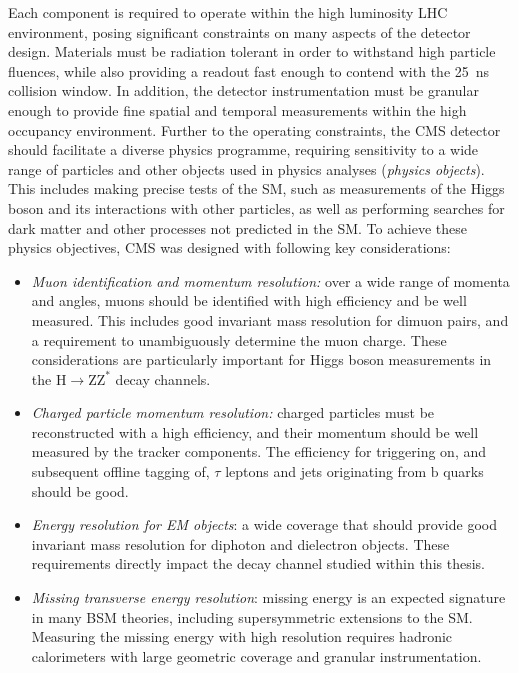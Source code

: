 Each component is required to operate within the high luminosity LHC environment, posing significant constraints on many aspects of the detector design. Materials must be radiation tolerant in order to withstand high particle fluences, while also providing a readout fast enough to contend with the 25~ns collision window. In addition, the detector instrumentation must be granular enough to provide fine spatial and temporal measurements within the high occupancy environment. Further to the operating constraints, the CMS detector should facilitate a diverse physics programme, requiring sensitivity to a wide range of particles and other objects used in physics analyses (\textit{physics objects}). This includes making precise tests of the SM, such as measurements of the Higgs boson and its interactions with other particles, as well as performing searches for dark matter and other processes not predicted in the SM. To achieve these physics objectives, CMS was designed with following key considerations: 

\begin{itemize}
    \item \textit{Muon identification and momentum resolution:} over a  wide  range  of  momenta and angles, muons should be identified with high efficiency and be well measured. This includes good invariant mass resolution for dimuon pairs, and a requirement to unambiguously determine the muon charge. These considerations are particularly important for Higgs boson measurements in the $\mathrm{H}\rightarrow \mathrm{ZZ}^{*}$ decay channels.
    
    \item \textit{Charged particle momentum resolution:} charged particles must be reconstructed with a high efficiency, and their momentum should be well measured by the tracker components.  The efficiency for triggering on, and subsequent offline tagging of, $\tau$ leptons and jets originating from $\mathrm{b}$ quarks should be good. %
    
    \item \textit{Energy resolution for EM objects}: a wide coverage that should provide good invariant mass resolution for diphoton and dielectron objects. These requirements directly impact the \Hee decay channel studied within this thesis.
    
    \item \textit{Missing transverse energy resolution}: missing energy is an expected signature in many BSM theories, including supersymmetric extensions to the SM. Measuring the missing energy with high resolution requires hadronic calorimeters with large geometric coverage and granular instrumentation.
\end{itemize}

